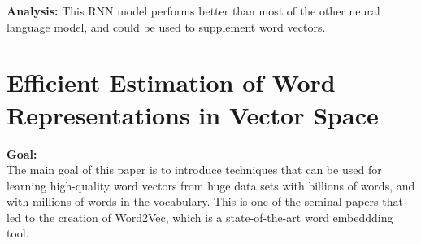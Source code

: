 \documentclass[11pt,a4paper]{article}
\begin{document}
  \textbf{Analysis:}
  This RNN model performs better than most of the other neural language model, and could be used to supplement word vectors.
  


\section{Efficient Estimation of Word Representations in Vector Space} %
\label{sec:efficient_estimation_of_word_representations_in_vector_space}

  \textbf{Goal:}\\
  The main goal of this paper is to introduce techniques that can be used for learning high-quality word vectors from huge data sets with billions of words, and with millions of words in the vocabulary. This is one of the seminal papers that led to the creation of Word2Vec, which is a state-of-the-art word embeddding tool. \cite{mikolov2013efficient}\\
\end{document}
